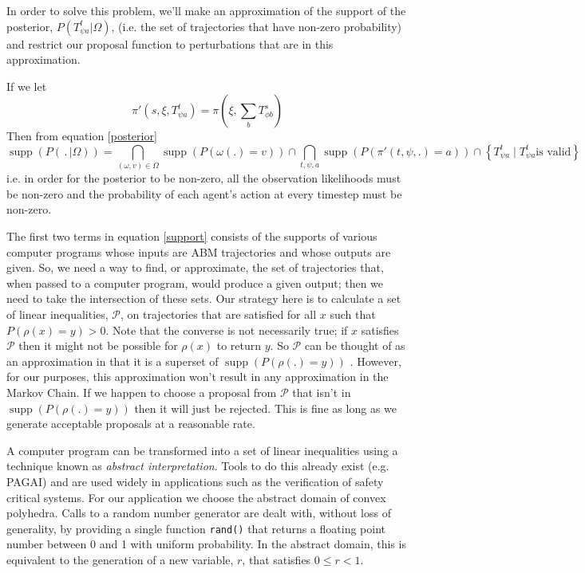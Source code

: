 \documentclass{article}
\DeclareMathOperator\supp{supp}
\begin{document}
In order to solve this problem, we'll make an approximation of the support of the posterior, $P(T^t_{\psi a}|\Omega)$, (i.e. the set of trajectories that have non-zero probability) and restrict our proposal function to perturbations that are in this approximation.

If we let
\[
\pi'(s, \xi, T^t_{\psi a}) = \pi(\xi,\sum_bT^{s}_{\phi b})
\]
Then from equation \ref{posterior}
\begin{equation}
\supp (P( \,.\, |\Omega)) = 
\bigcap_{(\omega,v) \in \Omega}  \supp\left(P\left(\omega(.)=v\right)\right) \cap
\bigcap_{t, \psi, a} \supp\left(P\left( \pi'(t,\psi,.) = a \right)\right) \cap
\left\{T^t_{\psi a} \mid T^t_{\psi a} \text{is valid}\right\}
\label{support}
\end{equation}
i.e. in order for the posterior to be non-zero, all the observation likelihoods must be non-zero and the probability of each agent's action at every timestep must be non-zero.

The first two terms in equation \ref{support} consists of the supports of various computer programs whose inputs are ABM trajectories and whose outputs are given. So, we need a way to find, or approximate, the set of trajectories that, when passed to a computer program, would produce a given output; then we need to take the intersection of these sets. Our strategy here is to calculate a set of linear inequalities, $\mathcal{P}$, on trajectories that are satisfied for all $x$ such that $P(\rho(x)=y) > 0$. Note that the converse is not necessarily true; if $x$ satisfies $\mathcal{P}$ then it might not be possible for $\rho(x)$ to return $y$. So $\mathcal{P}$ can be thought of as an approximation in that it is a superset of $\supp(P(\rho(.)=y))$ . However, for our purposes, this approximation won't result in any approximation in the Markov Chain. If we happen to choose a proposal from $\mathcal{P}$ that isn't in $\supp(P(\rho(.)=y))$ then it will just be rejected. This is fine as long as we generate acceptable proposals at a reasonable rate.

A computer program can be transformed into a set of linear inequalities using a technique known as \textit{abstract interpretation}\cite{cousot1977abstract}. Tools to do this already exist (e.g. PAGAI\cite{henry2012pagai}) and are used widely in applications such as the verification of safety critical systems\cite{blanchet2003static}. For our application we choose the abstract domain of convex polyhedra\cite{cousot1978automatic}\cite{becchi2018efficient}. Calls to a random number generator are dealt with, without loss of generality, by providing a single function \texttt{rand()} that returns a floating point number between 0 and 1 with uniform probability. In the abstract domain, this is equivalent to the generation of a new variable, $r$, that satisfies $0 \le r < 1$.
\end{document}
